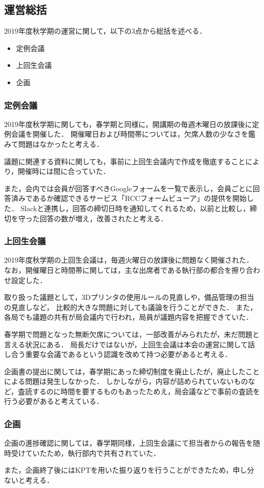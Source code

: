 \subsection*{運営総括}
2019年度秋学期の運営に関して，以下の3点から総括を述べる．
\begin{itemize}
    \item 定例会議
    \item 上回生会議
    \item 企画
\end{itemize}

\subsubsection*{定例会議}
2019年度秋学期に関しても，春学期と同様に，開講期の毎週木曜日の放課後に定例会議を開催した．
開催曜日および時間帯については，欠席人数の少なさを鑑みて問題はなかったと考える．

議題に関連する資料に関しても，事前に上回生会議内で作成を徹底することにより，開催時には間に合っていた．

また，会内では会員が回答すべきGoogleフォームを一覧で表示し，会員ごとに回答済みであるか確認できるサービス「RCCフォームビューア」の提供を開始した．
Slackと連携し，回答の締切日時を通知してくれるため，以前と比較し，締切を守った回答の数が増え，改善されたと考える．

\subsubsection*{上回生会議}
2019年度秋学期の上回生会議は，毎週火曜日の放課後に問題なく開催された．
なお，開催曜日と時間帯に関しては，主な出席者である執行部の都合を擦り合わせ設定した．

取り扱った議題として，3Dプリンタの使用ルールの見直しや，備品管理の担当の見直しなど，
比較的大きな問題に対しても議論を行うことができた．
また，各局でも議題の共有が局会議内で行われ，局員が議題内容を把握できていた．

春学期で問題となった無断欠席については，一部改善がみられたが，未だ問題と言える状況にある．
局長だけではないが，上回生会議は本会の運営に関して話し合う重要な会議であるという認識を改めて持つ必要があると考える．

企画書の提出に関しては，春学期にあった締切制度を廃止したが，廃止したことによる問題は発生しなかった．
しかしながら，内容が詰められていないものなど，査読するのに時間を要するものもあったためえ，局会議などで事前の査読を行う必要があると考えている．

\subsubsection*{企画}
企画の進捗確認に関しては，春学期同様，上回生会議にて担当者からの報告を随時受けていたため，執行部内で共有されていた．

また，企画終了後にはKPTを用いた振り返りを行うことができたため，申し分ないと考える．